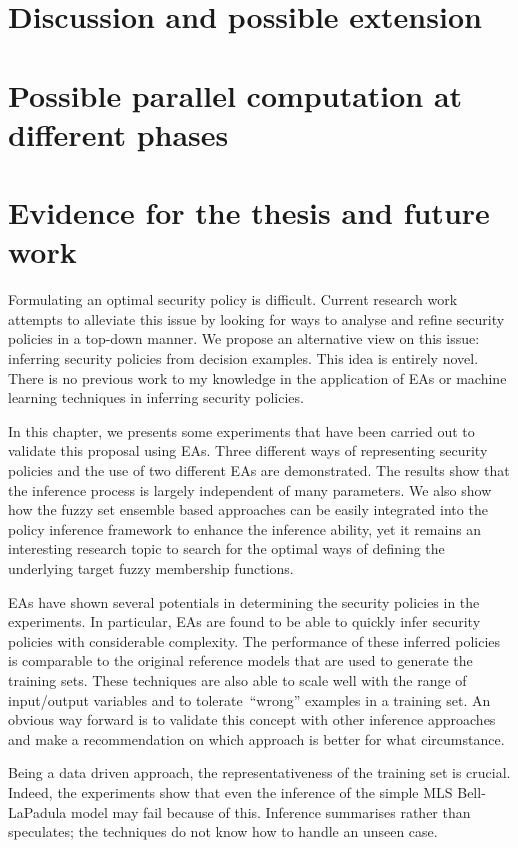 \section{Discussion and possible extension}

\section{Possible parallel computation at different phases}


\section{Evidence for the thesis and future work}
\label{sec:5.eftt}
Formulating an optimal security policy is difficult. Current research
work attempts to alleviate this issue by looking for ways to analyse
and refine security policies in a top-down manner. We propose an
alternative view on this issue: inferring security policies from
decision examples. This idea is entirely novel. There is no previous
work to my knowledge in the application of EAs or machine learning
techniques in inferring security policies.

In this chapter, we presents some experiments that have been carried
out to validate this proposal using EAs. Three different ways of
representing security policies and the use of two different EAs are
demonstrated. The results show that the inference process is largely
independent of many parameters. We also show how the fuzzy set
ensemble based approaches can be easily integrated into the policy
inference framework to enhance the inference ability, yet it remains
an interesting research topic to search for the optimal ways of
defining the underlying target fuzzy membership functions.

EAs have shown several potentials in determining the security policies
in the experiments. In particular, EAs are found to be able to quickly
infer security policies with considerable complexity. The performance
of these inferred policies is comparable to the original reference
models that are used to generate the training sets. These techniques
are also able to scale well with the range of input/output variables
and to tolerate~``wrong'' examples in a training set. An obvious way
forward is to validate this concept with other inference approaches
and make a recommendation on which approach is better for what
circumstance.

Being a data driven approach, the representativeness of the training
set is crucial. Indeed, the experiments show that even the inference
of the simple MLS Bell-LaPadula model may fail because of
this. Inference summarises rather than speculates; the techniques do
not know how to handle an unseen case.

